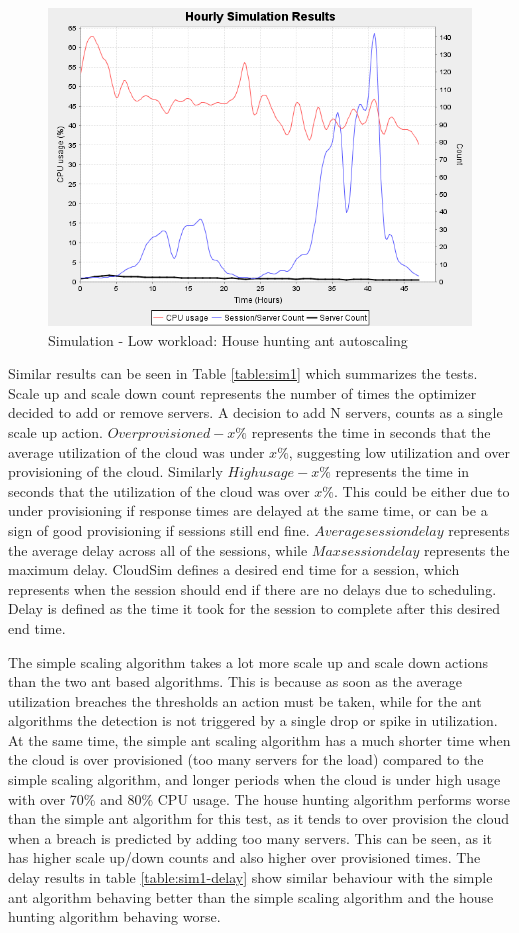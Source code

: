 \documentclass[conference]{IEEEtran}
\begin{document}
\begin{figure}
	\centering
		\includegraphics[width=0.75\columnwidth]{results/sim1/sim1-antHHstats.png}
	\caption{Simulation - Low workload: House hunting ant autoscaling}
	\label{fig:sim1-antHHstats}
\end{figure}

Similar results can be seen in Table \ref{table:sim1} which summarizes the tests. Scale up and scale down count represents the number of times the optimizer decided to add or remove servers. A decision to add N servers, counts as a single scale up action. $Over provisioned - x\%$ represents the time in seconds that the average utilization of the cloud was under $x\%$, suggesting low utilization and over provisioning of the cloud. Similarly $High usage - x\%$ represents the time in seconds that the utilization of the cloud was over $x\%$. This could be either due to under provisioning if response times are delayed at the same time, or can be a sign of good provisioning if sessions still end fine. $Average session delay$ represents the average delay across all of the sessions, while $Max session delay$ represents the maximum delay. CloudSim defines a desired end time for a session, which represents when the session should end if there are no delays due to scheduling. Delay is defined as the time it took for the session to complete after this desired end time.

The simple scaling algorithm takes a lot more scale up and scale down actions than the two ant based algorithms. This is because as soon as the average utilization breaches the thresholds an action must be taken, while for the ant algorithms the detection is not triggered by a single drop or spike in utilization. At the same time, the simple ant scaling algorithm has a much shorter time when the cloud is over provisioned (too many servers for the load) compared to the simple scaling algorithm, and longer periods when the cloud is under high usage with over 70\% and 80\% CPU usage. The house hunting algorithm performs worse than the simple ant algorithm for this test, as it tends to over provision the cloud when a breach is predicted by adding too many servers. This can be seen, as it has higher scale up/down counts and also higher over provisioned times. The delay results in table \ref{table:sim1-delay} show similar behaviour with the simple ant algorithm behaving better than the simple scaling algorithm and the house hunting algorithm behaving worse.
\end{document}
